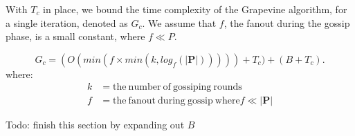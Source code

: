 With $T_c$ in place, we bound the time complexity of the \textsf{Grapevine}
algorithm, for a single iteration, denoted as $G_c$. We assume that $f$, the
fanout during the gossip phase, is a small constant, where $f \ll P$.

\[
G_c = (O(min(f\times min(k, log_f(\vert\mathbf{P}\vert))))) + T_c) + (B + T_c).
\]
where:
\begin{align*}
 k     & =  \mathrm{the\ number\ of\ gossiping\ rounds} \\
 f     & =  \mathrm{the\ fanout\ during\ gossip\ where} f \ll \vert\mathbf{P}\vert
\end{align*}

%

Todo: finish this section by expanding out $B$

